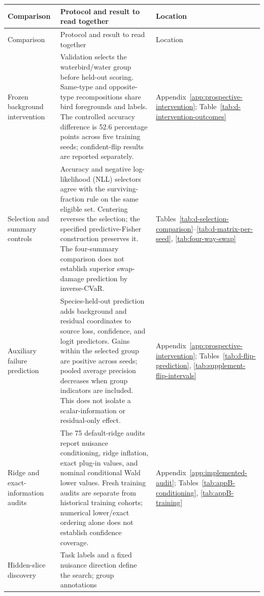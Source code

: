 \begingroup
\small
\setlength{\tabcolsep}{4pt}
\renewcommand{\arraystretch}{1.12}
\begin{longtable}{@{}>{\raggedright\arraybackslash}p{.20\linewidth}
                  >{\raggedright\arraybackslash}p{.52\linewidth}
                  >{\raggedright\arraybackslash}p{.23\linewidth}@{}}
\toprule
Comparison & Protocol and result to read together & Location \\
\midrule
\endfirsthead
\toprule
Comparison & Protocol and result to read together & Location \\
\midrule
\endhead
Frozen background intervention &
Validation selects the waterbird/water group before held-out scoring. Same-type
and opposite-type recompositions share bird foregrounds and labels. The
controlled accuracy difference is 52.6 percentage points across five training
seeds; confident-flip results are reported separately. &
Appendix~\ref{app:prospective-intervention};
Table~\ref{tab:d-intervention-outcomes} \\
\addlinespace
Selection and summary controls &
Accuracy and negative log-likelihood (NLL) selectors agree with the surviving-fraction rule on the same
eligible set. Centering reverses the selection; the specified predictive-Fisher
construction preserves it. The four-summary comparison does not establish
superior swap-damage prediction by inverse-CVaR. &
Tables~\ref{tab:d-selection-comparison}--\ref{tab:d-matrix-per-seed},
\ref{tab:four-way-swap} \\
\addlinespace
Auxiliary failure prediction &
Species-held-out prediction adds background and residual coordinates to source
loss, confidence, and logit predictors. Gains within the selected group are
positive across seeds; pooled average precision decreases when group indicators are
included. This does not isolate a scalar-information or residual-only effect. &
Appendix~\ref{app:prospective-intervention};
Tables~\ref{tab:d-flip-prediction}, \ref{tab:supplement-flip-intervals} \\
\addlinespace
Ridge and exact-information audits &
The 75 default-ridge audits report nuisance conditioning, ridge inflation, exact
plug-in values, and nominal conditional Wald lower values. Fresh training
audits are separate from historical training cohorts; numerical lower/exact
ordering alone does not establish confidence coverage. &
Appendix~\ref{app:implemented-audit};
Tables~\ref{tab:appB-conditioning}, \ref{tab:appB-training} \\
\addlinespace
Hidden-slice discovery &
Task labels and a fixed nuisance direction define the search; group annotations

\end{longtable}
